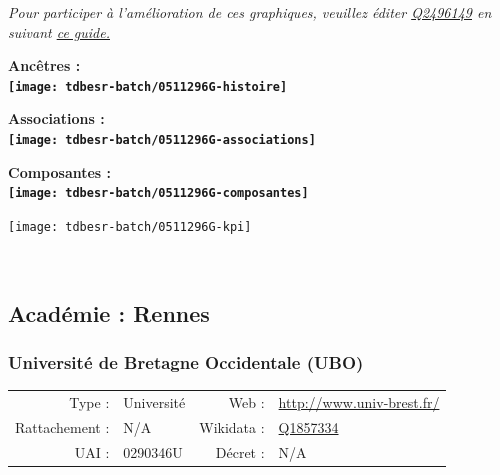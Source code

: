 \documentclass[12pt,french,]{article}
\begin{document}
\textit{\scriptsize Pour participer à l'amélioration de ces graphiques, veuillez éditer  \href{https://www.wikidata.org/entity/Q2496149}{Q2496149}  en suivant \href{https://github.com/cpesr/wikidataESR/blob/master/Rmd/wikidataESR.md}{ce guide.}}

\vspace{1cm}  
\begin{minipage}[b]{0.50\textwidth}\begin{center} \bf Ancêtres : \\  
\texttt{[image: tdbesr-batch/0511296G-histoire]} \end{center}\end{minipage}\begin{minipage}[b]{0.50\textwidth}\begin{center} \bf Associations : \\  
\texttt{[image: tdbesr-batch/0511296G-associations]} \end{center}\end{minipage}

\hrulefill

\begin{center} \bf Composantes : \\  
\texttt{[image: tdbesr-batch/0511296G-composantes]} \end{center}

\begin{center}\texttt{[image: tdbesr-batch/0511296G-kpi]} \end{center}\checkoddpage

\ifoddpage ~\newpage \fi   

\hypertarget{acaduxe9mie-rennes}{%
\subsection{Académie : Rennes}\label{acaduxe9mie-rennes}}

\hypertarget{universituxe9-de-bretagne-occidentale-ubo}{%
\subsubsection{Université de Bretagne Occidentale
(UBO)}\label{universituxe9-de-bretagne-occidentale-ubo}}

\begin{tabular*}{\textwidth}{rp{5cm}rl}  
\hline  
Type : & Université & Web : &\href{http://www.univ-brest.fr/}{http://www.univ-brest.fr/} \\  
Rattachement : & N/A & Wikidata : & \href{https://www.wikidata.org/entity/Q1857334}{Q1857334} \\  
UAI : & 0290346U & Décret : & N/A \\  
\hline  
\end{tabular*}
\end{document}
